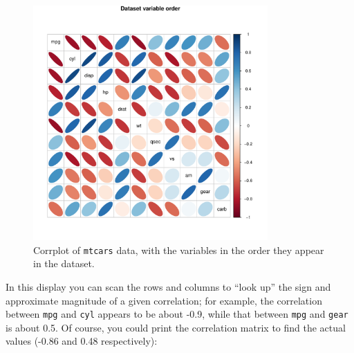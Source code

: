 \documentclass[
  letterpaper,
  10pt,
  krantz2]{krantz}
\begin{document}
\begin{figure}[H]

{\centering \includegraphics[width=0.8\textwidth,height=\textheight]{figs/ch04/fig-mtcars-corrplot-varorder-1.pdf}

}

\caption{\label{fig-mtcars-corrplot-varorder}Corrplot of \texttt{mtcars}
data, with the variables in the order they appear in the dataset.}

\end{figure}

In this display you can scan the rows and columns to ``look up'' the
sign and approximate magnitude of a given correlation; for example, the
correlation between \texttt{mpg} and \texttt{cyl} appears to be about
-0.9, while that between \texttt{mpg} and \texttt{gear} is about 0.5. Of
course, you could print the correlation matrix to find the actual values
(-0.86 and 0.48 respectively):
\end{document}
